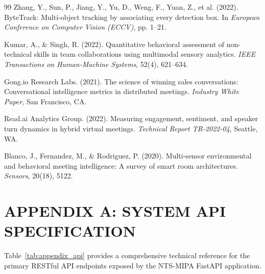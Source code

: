 \documentclass[12pt,a4paper,oneside]{report}
\begin{document}
\begin{thebibliography}{99}
Zhang, Y., Sun, P., Jiang, Y., Yu, D., Weng, F., Yuan, Z., et al. (2022). ByteTrack: Multi-object tracking by associating every detection box. In \textit{European Conference on Computer Vision (ECCV)}, pp. 1--21.

Kumar, A., \& Singh, R. (2022). Quantitative behavioral assessment of non-technical skills in team collaborations using multimodal sensory analytics. \textit{IEEE Transactions on Human-Machine Systems}, 52(4), 621--634.

Gong.io Research Labs. (2021). The science of winning sales conversations: Conversational intelligence metrics in distributed meetings. \textit{Industry White Paper}, San Francisco, CA.

Read.ai Analytics Group. (2022). Measuring engagement, sentiment, and speaker turn dynamics in hybrid virtual meetings. \textit{Technical Report TR-2022-04}, Seattle, WA.

Blanco, J., Fernandez, M., \& Rodriguez, P. (2020). Multi-sensor environmental and behavioral meeting intelligence: A survey of smart room architectures. \textit{Sensors}, 20(18), 5122.
\end{thebibliography}

\clearpage
\appendix
\chapter*{APPENDIX A: SYSTEM API SPECIFICATION}

Table~\ref{tab:appendix_api} provides a comprehensive technical reference for the primary RESTful API endpoints exposed by the NTS-MIPA FastAPI application.
\end{document}
